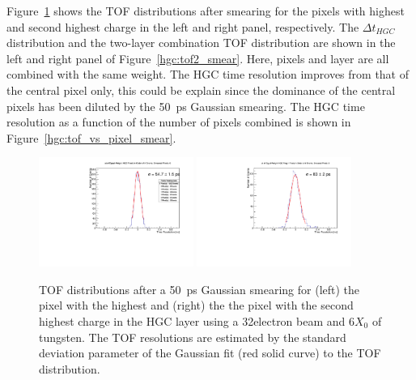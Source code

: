 Figure~\ref{hgc:tof1_smear} shows the TOF distributions after smearing
for the pixels with highest and second highest charge in the left and
right panel, respectively. The $\Delta t_{HGC}$ distribution and the
two-layer combination TOF distribution are shown in the left and right panel of
Figure~\ref{hgc:tof2_smear}. Here, pixels and layer are all combined
with the same weight. The HGC time resolution improves from that of
the central pixel only, this could be explain since the dominance of
the central pixels has been diluted by the 50~ps Gaussian
smearing. The HGC time resolution as a function of the number of
pixels combined is shown in
Figure~\ref{hgc:tof_vs_pixel_smear}. 
\begin{figure}[h] 
\centering
\includegraphics[width=0.45\textwidth]{HGC/SKIROC_1_Pixels50.pdf} 
\includegraphics[width=0.45\textwidth]{HGC/SKIROC_1_Pixels_NoCenter50.pdf} 
\caption{TOF distributions after a 50~ps Gaussian smearing for (left) the pixel with the highest and (right) the
  the pixel with the second highest charge in the HGC layer using a
  32\GeV electron beam and 6$X_{0}$ of tungsten. The TOF resolutions are estimated by the
standard deviation parameter of the Gaussian fit (red solid curve) to the TOF distribution.} 
\label{hgc:tof1_smear} 
\end{figure}
